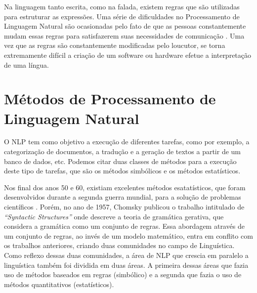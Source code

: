 Na linguagem tanto escrita, como na falada, existem regras que são utilizadas
para estruturar as expressões. Uma série de dificuldades no Processamento de
Linguagem Natural são ocasionadas pelo fato de que as pessoas constantemente
mudam essas regras para satisfazerem suas necessidades de comunicação
\cite{manningschutze1999}. Uma vez que as regras são constantemente modificadas pelo loucutor, se torna extremamente difícil a criação de um software ou hardware efetue a interpretação de uma língua.


%
%
%

\section{Métodos de Processamento de Linguagem Natural}

O \ac{NLP} tem como objetivo a execução de diferentes tarefas, como por exemplo,
a categorização de documentos, a tradução e a geração de textos a partir de um
banco de dados, etc. Podemos citar duas classes de métodos para a execução deste
tipo de tarefas, que são os métodos simbólicos e os métodos estatísticos.

Nos final dos anos 50 e 60, existiam excelentes métodos esatatísticos, que foram
desenvolvidos durante a segunda guerra mundial, para a solução de problemas
científicos \cite{shannon48}.
Porém, no ano de 1957, Chomsky publicou o trabalho intitulado de
\textit{``Syntactic Structures''} onde descreve a
teoria de gramática gerativa, que considera a gramática como um conjunto de regras. Essa abordagem através de um
conjunto de regras, ao invés de um modelo matemático, entra em conflito com os
trabalhos anteriores, criando duas comunidades no campo de Linguística. Como
reflexo dessas duas comunidades, a área de \ac{NLP} que crescia em paralelo a
linguística também foi dividida em duas áreas. A primeira dessas áreas que fazia
uso de métodos baseados em regras (simbólico) e a segunda que fazia o uso de
métodos quantitativos (estatísticos).


